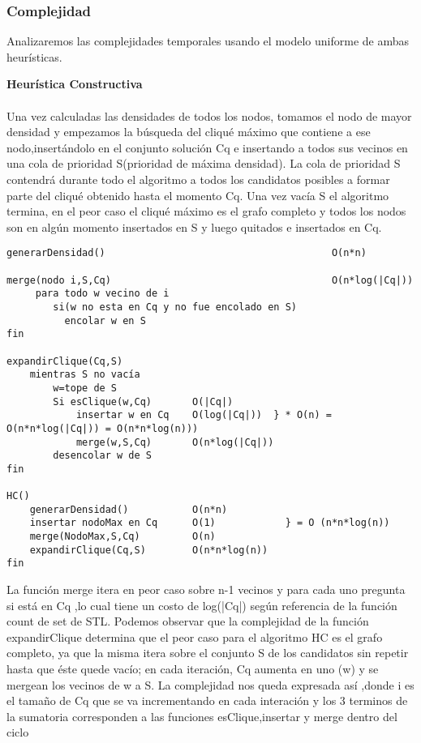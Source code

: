 \subsubsection{Complejidad}
Analizaremos las complejidades temporales usando el modelo uniforme de ambas heurísticas.

\textbf{Heurística Constructiva}\\
\\
Una vez calculadas las densidades de todos los nodos, tomamos el nodo de mayor densidad y empezamos la búsqueda del cliqué máximo que contiene a ese nodo,insertándolo en el conjunto solución Cq e insertando a todos sus vecinos en una cola de prioridad S(prioridad de máxima densidad).
La cola de prioridad S contendrá durante todo el algoritmo a todos los candidatos posibles a formar parte del cliqué obtenido hasta el momento Cq.
Una vez vacía S el algoritmo termina, en el peor caso el cliqué máximo es el grafo completo y todos los nodos son en algún momento insertados en S y luego quitados e insertados en Cq.

\begin{verbatim}
generarDensidad()										O(n*n)
	
merge(nodo i,S,Cq)										O(n*log(|Cq|))	        
     para todo w vecino de i 
        si(w no esta en Cq y no fue encolado en S)
          encolar w en S
fin

expandirClique(Cq,S)								
    mientras S no vacía					 			
        w=tope de S									
        Si esClique(w,Cq)       O(|Cq|)				
            insertar w en Cq    O(log(|Cq|))  } * O(n) = O(n*n*log(|Cq|)) = O(n*n*log(n)))
            merge(w,S,Cq)       O(n*log(|Cq|))		
        desencolar w de S		              
fin												
									
HC()										 	
    generarDensidad()           O(n*n)		   	
    insertar nodoMax en Cq      O(1)            } = O (n*n*log(n)) 	
    merge(NodoMax,S,Cq)         O(n)			   
    expandirClique(Cq,S)        O(n*n*log(n))	 	
fin												

\end{verbatim}
La función merge itera en peor caso sobre n-1 vecinos y para cada uno pregunta si está en Cq ,lo cual tiene un costo de log(|Cq|) según referencia de la función count de set de STL. 
Podemos observar que la complejidad de la función expandirClique determina que el peor caso para el algoritmo HC es el grafo completo, ya que la misma itera sobre el conjunto S de los candidatos sin repetir hasta que éste quede vacío; en cada iteración, Cq aumenta en uno (w) y se mergean los vecinos de w a S.
La complejidad nos queda expresada así ,donde i es el tamaño de Cq que se va incrementando en cada interación y los 3 terminos de la sumatoria corresponden a las funciones esClique,insertar y merge dentro del ciclo

